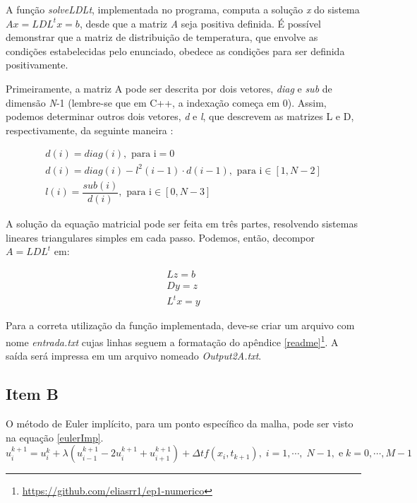 \documentclass[12pt]{article}
\begin{document}
\begin{spacing}{1.5}
A função \textit{solveLDLt}, implementada no programa, computa a solução \textit{x} do sistema $Ax = LDL^{t}x = b$, desde que a matriz \textit{A} seja positiva definida. É possível demonstrar \supercite{heat} que a matriz de distribuição de temperatura, que envolve as condições estabelecidas pelo enunciado, obedece as condições para ser definida positivamente.

Primeiramente, a matriz A pode ser descrita por dois vetores, \textit{diag} e \textit{sub} de dimensão \textit{N}-1 (lembre-se que em C++, a indexação começa em 0). Assim, podemos determinar outros dois vetores, \textit{d} e \textit{l}, que descrevem as matrizes L e D, respectivamente, da seguinte maneira \supercite{cholesky}:

\begin{gather}
    d(i) = diag(i), \text{ para i}= 0 \\
    d(i) = diag(i) - l^2(i-1)\cdot d(i-1), \text{ para i} \in [1, \textit{N}-2] \\
    l(i) = \dfrac{sub(i)}{d(i)}, \text{ para i} \in [0, \textit{N}-3]
\end{gather}

A solução da equação matricial pode ser feita em três partes, resolvendo sistemas lineares triangulares simples em cada passo. Podemos, então, decompor $A = LDL^t$ em:

\setlength{\abovedisplayskip}{0.05cm}
\setlength{\belowdisplayskip}{0.2cm}
\begin{gather*}
    L z = b \\
	D y = z \\
	L^t x = y 
\end{gather*}

Para a correta utilização da função implementada, deve-se criar um arquivo com nome \textit{entrada.txt} cujas linhas seguem a formatação do apêndice \ref{readme}\footnote{\url{https://github.com/eliasrr1/ep1-numerico}}. A saída será impressa em um arquivo nomeado \textit{Output2A.txt}.

\subsection{Item B}

O método de Euler implícito, para um ponto específico da malha, pode ser visto na equação \eqref{eulerImp}.
\setlength{\abovedisplayskip}{0.2cm}
\setlength{\belowdisplayskip}{0.2cm}
\begin{equation} \label{eulerImp}
u_{i}^{k+1} = u_i^k + \lambda(u^{k+1}_{i-1} - 2u^{k+1}_{i} + u_{i+1}^{k+1}) + \Delta t f(x_{i},t_{k+1}), \; i = 1,\cdots ,\; \textit{N}-1, \;\text{e} \; k = 0, \cdots, \textit{M}-1\;
\end{equation}


\end{spacing}
\end{document}
